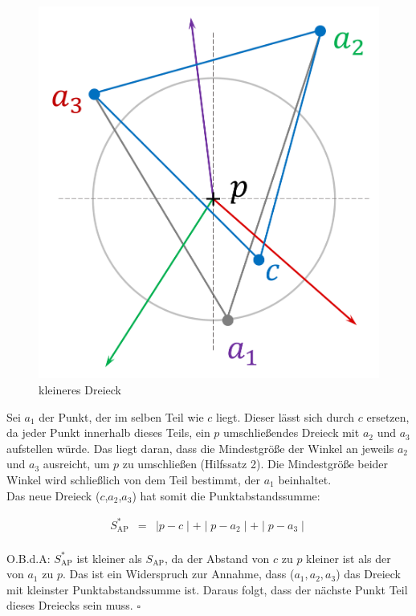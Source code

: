 \documentclass[a4paper]{extarticle}
\begin{document}
    \begin{figure}[!ht]
        \centering	
        \includegraphics[scale=0.15]{bilder/tri_3.pdf}
        \caption{kleineres Dreieck}
        \label{fig:triangulation_3}
    \end{figure}

    Sei $a_1$ der Punkt, der im selben Teil wie $c$ liegt. Dieser lässt sich durch $c$ ersetzen, 
    da jeder Punkt innerhalb dieses Teils, ein $p$ umschließendes Dreieck mit $a_2$ und $a_3$ 
    aufstellen würde. Das liegt daran, dass die Mindestgröße der 
    Winkel an jeweils $a_2$ und $a_3$ ausreicht, um $p$ zu umschließen (Hilfssatz 2).
    Die Mindestgröße beider Winkel wird schließlich von dem Teil bestimmt, der $a_1$ beinhaltet. \\
    Das neue Dreieck ($c$,$a_2$,$a_3$) hat somit die Punktabstandssumme:

    \begin{eqnarray*}
        S^*_{\text{AP}} &=& \mid p - c \mid + \mid p - a_2 \mid + \mid p - a_3 \mid \\
    \end{eqnarray*}

    O.B.d.A: $S^*_{\text{AP}}$ ist kleiner als $S_{\text{AP}}$, da der Abstand von $c$ zu $p$
    kleiner ist als der von $a_1$ zu $p$. Das ist ein Widerspruch zur Annahme, dass ($a_1, a_2, a_3$) 
    das Dreieck mit kleinster Punktabstandssumme ist. Daraus folgt, dass der nächste
    Punkt Teil dieses Dreiecks sein muss. $\square$
\end{document}
